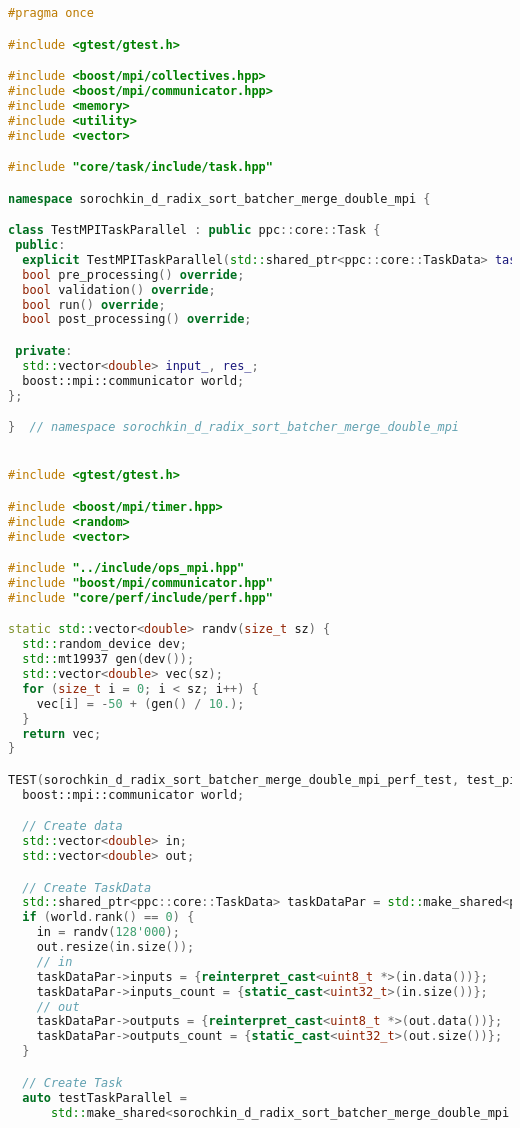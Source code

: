 \documentclass[12pt]{article}
\begin{document}
\begin{lstlisting}[language=C++, caption={Код алгоритма}]
#pragma once

#include <gtest/gtest.h>

#include <boost/mpi/collectives.hpp>
#include <boost/mpi/communicator.hpp>
#include <memory>
#include <utility>
#include <vector>

#include "core/task/include/task.hpp"

namespace sorochkin_d_radix_sort_batcher_merge_double_mpi {

class TestMPITaskParallel : public ppc::core::Task {
 public:
  explicit TestMPITaskParallel(std::shared_ptr<ppc::core::TaskData> taskData_) : Task(std::move(taskData_)) {}
  bool pre_processing() override;
  bool validation() override;
  bool run() override;
  bool post_processing() override;

 private:
  std::vector<double> input_, res_;
  boost::mpi::communicator world;
};

}  // namespace sorochkin_d_radix_sort_batcher_merge_double_mpi


#include <gtest/gtest.h>

#include <boost/mpi/timer.hpp>
#include <random>
#include <vector>

#include "../include/ops_mpi.hpp"
#include "boost/mpi/communicator.hpp"
#include "core/perf/include/perf.hpp"

static std::vector<double> randv(size_t sz) {
  std::random_device dev;
  std::mt19937 gen(dev());
  std::vector<double> vec(sz);
  for (size_t i = 0; i < sz; i++) {
    vec[i] = -50 + (gen() / 10.);
  }
  return vec;
}

TEST(sorochkin_d_radix_sort_batcher_merge_double_mpi_perf_test, test_pipeline_run) {
  boost::mpi::communicator world;

  // Create data
  std::vector<double> in;
  std::vector<double> out;

  // Create TaskData
  std::shared_ptr<ppc::core::TaskData> taskDataPar = std::make_shared<ppc::core::TaskData>();
  if (world.rank() == 0) {
    in = randv(128'000);
    out.resize(in.size());
    // in
    taskDataPar->inputs = {reinterpret_cast<uint8_t *>(in.data())};
    taskDataPar->inputs_count = {static_cast<uint32_t>(in.size())};
    // out
    taskDataPar->outputs = {reinterpret_cast<uint8_t *>(out.data())};
    taskDataPar->outputs_count = {static_cast<uint32_t>(out.size())};
  }

  // Create Task
  auto testTaskParallel =
      std::make_shared<sorochkin_d_radix_sort_batcher_merge_double_mpi::TestMPITaskParallel>(taskDataPar);


\end{lstlisting}
\end{document}
